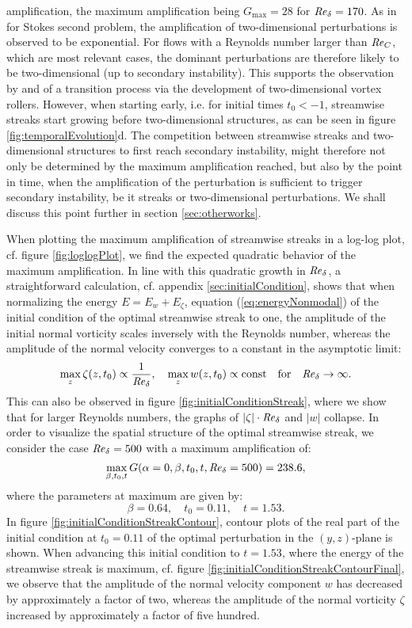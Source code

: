 \documentclass{jfm}
\newcommand\be{\begin{equation}}
\newcommand\ee{\end{equation}}
\newcommand\Rey{\mbox{\textit{Re}}}  %
\begin{document}
amplification, the maximum amplification being $ G_{\max} = 28 $ for
$ \Rey_\delta = 170 $. As in \citet{Biau2016} for Stokes second problem,
the amplification of two-dimensional perturbations is observed
to be exponential. For flows with a Reynolds number
larger than $ \Rey_C $, which are most relevant cases, the dominant
perturbations are therefore likely to be two-dimensional (up to secondary instability). 
This supports the observation by \citet{VittoriBlondeaux2008} and
\citet{OzdemirHsuBalachandar2013} of a transition process
via the development of two-dimensional vortex rollers. However,
when starting early, i.e. for initial times $ t_0 < -1 $,
streamwise streaks start growing before
two-dimensional structures, as can be seen in figure \ref{fig:temporalEvolution}d.
The competition between streamwise streaks and two-dimensional
structures to first reach secondary instability, might therefore
not only be determined by the maximum amplification reached,
but also by
the point in time, when the amplification of the perturbation
is sufficient to trigger secondary instability, be it streaks
or two-dimensional perturbations. We shall discuss this point
further in section \ref{sec:otherworks}. 

When plotting the maximum amplification of streamwise streaks in 
a log-log plot, cf. figure \ref{fig:loglogPlot}, we find the
expected quadratic behavior of the maximum amplification.
In line with this quadratic growth in $ \Rey_\delta $, a straightforward calculation,
cf. appendix \ref{sec:initialCondition},
shows that when normalizing the energy $ E =  E_w + E_\zeta $, equation (\ref{eq:energyNonmodal}) of the initial condition of the
optimal streamwise streak to one, the amplitude of the initial normal vorticity
scales inversely with the Reynolds number,
whereas the amplitude of the normal velocity converges to a constant in the
asymptotic limit:
\be
\max_z \zeta(z,t_0) \propto \frac{1}{\Rey_\delta}, \quad
\max_z w(z,t_0) \propto {\rm const} \quad \mbox{for} \quad \Rey_\delta \rightarrow \infty. \label{fig:scalingStreaksInfty}
\ee
This can also be observed in
figure \ref{fig:initialConditionStreak}, where we show that
for larger Reynolds numbers, the graphs of $ | \zeta | \cdot \Rey_\delta $ 
and $ | w | $ collapse.
In order to visualize the
spatial structure of the optimal streamwise streak,
we consider the case $ \Rey_\delta = 500 $ with
a maximum amplification of: 
\be
\max_{\beta,t_0,t} G(\alpha=0,\beta,t_0,t,\Rey_\delta = 500 ) = 238.6,
\ee
where the parameters at maximum are given by:
\be
\beta = 0.64, \quad t_0 = 0.11, \quad t = 1.53. 
\ee
In figure \ref{fig:initialConditionStreakContour}, contour plots of
the real part of the
initial condition at $ t_0 = 0.11 $ of the optimal perturbation
in the $ (y,z) $-plane is shown.
When advancing this initial condition to $ t = 1.53 $, where
the energy of the streamwise streak is maximum, cf.
figure \ref{fig:initialConditionStreakContourFinal}, we observe
that the amplitude of the normal velocity component $ w $ has
decreased by approximately a factor of two, whereas the amplitude
of the normal vorticity $ \zeta $ increased by approximately
a factor of five hundred. \\
\end{document}
